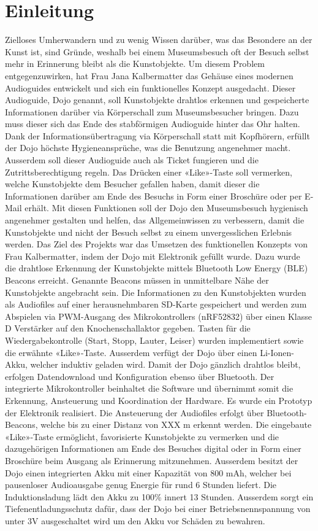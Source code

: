 \section{Einleitung}\label{sec:einleitung}

Zielloses Umherwandern und zu wenig Wissen darüber, was das Besondere an der Kunst ist, sind Gründe, weshalb bei einem Museumsbesuch oft der Besuch selbst mehr in Erinnerung bleibt als die Kunstobjekte. Um diesem Problem entgegenzuwirken, hat Frau Jana Kalbermatter das Gehäuse eines modernen Audioguides entwickelt und sich ein funktionelles Konzept ausgedacht. Dieser Audioguide, Dojo genannt, soll Kunstobjekte drahtlos erkennen und gespeicherte Informationen darüber via Körperschall zum Museumsbesucher bringen. Dazu muss dieser sich das Ende des stabförmigen Audioguide hinter das Ohr halten. Dank der Informationsübertragung via Körperschall statt mit Kopfhörern, erfüllt der Dojo höchste Hygieneansprüche, was die Benutzung angenehmer macht. Ausserdem soll dieser Audioguide auch als Ticket fungieren und die Zutrittsberechtigung regeln. Das Drücken einer «Like»-Taste soll vermerken, welche Kunstobjekte dem Besucher gefallen haben, damit dieser die Informationen darüber am Ende des Besuchs in Form einer Broschüre oder per E-Mail erhält. Mit diesen Funktionen soll der Dojo den Museumsbesuch hygienisch angenehmer gestalten und helfen, das Allgemeinwissen zu verbessern, damit die Kunstobjekte und nicht der Besuch selbst zu einem unvergesslichen Erlebnis werden. 
Das Ziel des Projekts war das Umsetzen des funktionellen Konzepts von Frau Kalbermatter, indem der Dojo mit Elektronik gefüllt wurde. Dazu wurde die drahtlose Erkennung der Kunstobjekte mittels Bluetooth Low Energy (BLE) Beacons erreicht. Genannte Beacons müssen in unmittelbare Nähe der Kunstobjekte angebracht sein. Die Informationen zu den Kunstobjekten wurden als Audiofiles auf einer herausnehmbaren SD-Karte gespeichert und werden zum Abspielen via PWM-Ausgang des Mikrokontrollers (nRF52832) über einen Klasse D Verstärker auf den Knochenschallaktor gegeben. Tasten für die Wiedergabekontrolle (Start, Stopp, Lauter, Leiser) wurden implementiert sowie die erwähnte «Like»-Taste. Ausserdem verfügt der Dojo über einen Li-Ionen-Akku, welcher induktiv geladen wird. Damit der Dojo gänzlich drahtlos bleibt, erfolgen Datendownload und Konfiguration ebenso über Bluetooth. Der integrierte Mikrokontroller beinhaltet die Software und übernimmt somit die Erkennung, Ansteuerung und Koordination der Hardware. 
Es wurde ein Prototyp der Elektronik realisiert. Die Ansteuerung der Audiofiles erfolgt über Bluetooth-Beacons, welche bis zu einer Distanz von XXX m erkennt werden. Die eingebaute «Like»-Taste ermöglicht, favorisierte Kunstobjekte zu vermerken und die dazugehörigen Informationen am Ende des Besuches digital oder in Form einer Broschüre beim Ausgang als Erinnerung mitzunehmen. Ausserdem besitzt der Dojo einen integrierten Akku mit einer Kapazität von 800 mAh, welcher bei pausenloser Audioausgabe genug Energie für rund 6 Stunden liefert. Die Induktionsladung lädt den Akku zu 100\% innert 13 Stunden. Ausserdem sorgt ein Tiefenentladungsschutz dafür, dass der Dojo bei einer Betriebsnennspannung von unter 3V ausgeschaltet wird um den Akku vor Schäden zu bewahren.
